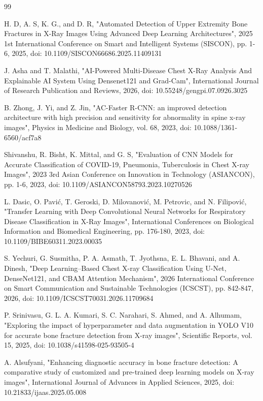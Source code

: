 \documentclass[conference]{IEEEtran}
\begin{document}
\begin{thebibliography}{99}

 H. D, A. S, K. G., and D. R, "Automated Detection of Upper Extremity Bone Fractures in X-Ray Images Using Advanced Deep Learning Architectures", 2025 1st International Conference on Smart and Intelligent Systems (SISCON), pp. 1-6, 2025, doi: 10.1109/SISCON66686.2025.11409131

 J. Asha and T. Malathi, "AI-Powered Multi-Disease Chest X-Ray Analysis And Explainable AI System Using Densenet121 and Grad-Cam", International Journal of Research Publication and Reviews, 2026, doi: 10.55248/gengpi.07.0926.3025

 B. Zhong, J. Yi, and Z. Jin, "AC-Faster R-CNN: an improved detection architecture with high precision and sensitivity for abnormality in spine x-ray images", Physics in Medicine and Biology, vol. 68, 2023, doi: 10.1088/1361-6560/acf7a8

 Shivanshu, R. Bisht, K. Mittal, and G. S, "Evaluation of CNN Models for Accurate Classification of COVID-19, Pneumonia, Tuberculosis in Chest X-ray Images", 2023 3rd Asian Conference on Innovation in Technology (ASIANCON), pp. 1-6, 2023, doi: 10.1109/ASIANCON58793.2023.10270526

 L. Dasic, O. Pavić, T. Geroski, D. Milovanović, M. Petrovic, and N. Filipović, "Transfer Learning with Deep Convolutional Neural Networks for Respiratory Disease Classification in X-Ray Images", International Conferences on Biological Information and Biomedical Engineering, pp. 176-180, 2023, doi: 10.1109/BIBE60311.2023.00035

 S. Yechuri, G. Susmitha, P. A. Asmath, T. Jyothsna, E. L. Bhavani, and A. Dinesh, "Deep Learning–Based Chest X-ray Classification Using U-Net, DenseNet121, and CBAM Attention Mechanism", 2026 International Conference on Smart Communication and Sustainable Technologies (ICSCST), pp. 842-847, 2026, doi: 10.1109/ICSCST70031.2026.11709684

 P. Srinivasu, G. L. A. Kumari, S. C. Narahari, S. Ahmed, and A. Alhumam, "Exploring the impact of hyperparameter and data augmentation in YOLO V10 for accurate bone fracture detection from X-ray images", Scientific Reports, vol. 15, 2025, doi: 10.1038/s41598-025-93505-4

 A. Alsufyani, "Enhancing diagnostic accuracy in bone fracture detection: A comparative study of customized and pre-trained deep learning models on X-ray images", International Journal of Advances in Applied Sciences, 2025, doi: 10.21833/ijaas.2025.05.008


\end{thebibliography}
\end{document}
